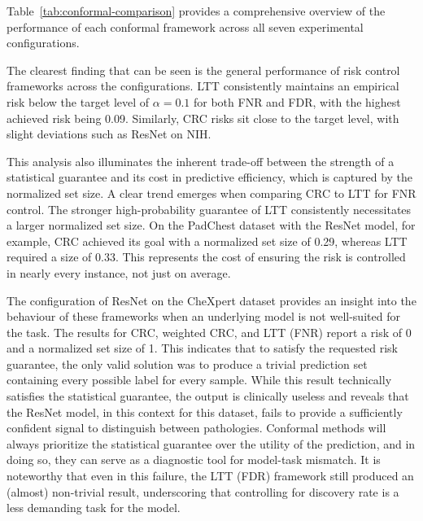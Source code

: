 Table~\ref{tab:conformal-comparison} provides a comprehensive overview of the performance
of each conformal framework across all seven experimental configurations.

The clearest finding that can be seen is the general performance
of risk control frameworks across the configurations.
LTT consistently maintains an empirical risk below the target level
of \(\alpha = 0.1\) for both FNR and FDR, with the highest achieved risk being 0.09.
Similarly, CRC risks sit close to the target level, with slight deviations
such as ResNet on NIH.

This analysis also illuminates the inherent trade-off
between the strength of a statistical guarantee and its cost in predictive efficiency,
which is captured by the normalized set size.
A clear trend emerges when comparing CRC to LTT for FNR control.
The stronger high-probability guarantee of LTT
consistently necessitates a larger normalized set size.
On the PadChest dataset with the ResNet model, for example,
CRC achieved its goal with a normalized set size of 0.29,
whereas LTT required a size of 0.33.
This represents the cost of ensuring the risk is controlled in nearly every instance,
not just on average.

The configuration of ResNet on the CheXpert dataset provides an insight
into the behaviour of these frameworks when an underlying model is not well-suited for the task.
The results for CRC, weighted CRC, and LTT (FNR) report a risk of 0
and a normalized set size of 1.
This indicates that to satisfy the requested risk guarantee,
the only valid solution was to produce a trivial prediction set
containing every possible label for every sample.
While this result technically satisfies the statistical guarantee,
the output is clinically useless and reveals that the ResNet model, in this context for this dataset,
fails to provide a sufficiently confident signal to distinguish between pathologies.
Conformal methods will always prioritize the statistical guarantee
over the utility of the prediction,
and in doing so, they can serve as a diagnostic tool for model-task mismatch.
It is noteworthy that even in this failure,
the LTT (FDR) framework still produced an (almost) non-trivial result,
underscoring that controlling for discovery rate is a less demanding task for the model.
